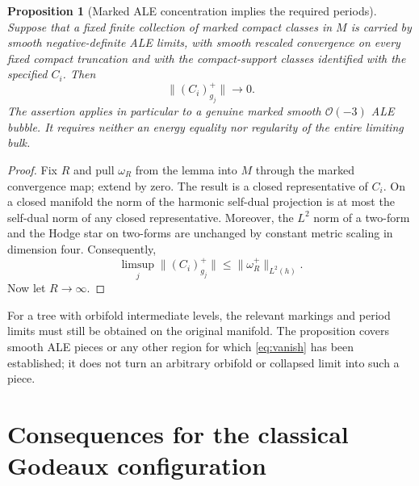 \documentclass[11pt,a4paper]{article}
\newtheorem{proposition}[theorem]{Proposition}
\theoremstyle{definition}
\theoremstyle{remark}
\begin{document}
\begin{proposition}[Marked ALE concentration implies the required periods]
Suppose that a fixed finite collection of marked compact classes in $M$
is carried by smooth negative-definite ALE limits, with smooth rescaled
convergence on every fixed compact truncation and with the compact-support
classes identified with the specified $C_i$. Then
\begin{equation}\label{eq:vanish}
 \|(C_i)^+_{g_j}\|\longrightarrow0.
\end{equation}
The assertion applies in particular to a genuine marked smooth
$\mathcal O(-3)$ ALE bubble. It requires neither an energy equality nor
regularity of the entire limiting bulk.
\end{proposition}
\begin{proof}
Fix $R$ and pull $\omega_R$ from the lemma into $M$ through the marked
convergence map; extend by zero. The result is a closed representative
of $C_i$. On a closed manifold the norm of the harmonic self-dual
projection is at most the self-dual norm of any closed representative.
Moreover, the $L^2$ norm of a two-form and the Hodge star on two-forms
are unchanged by constant metric scaling in dimension four. Consequently,
\[
 \limsup_j\|(C_i)^+_{g_j}\|\le\|\omega_R^+\|_{L^2(h)}.
\]
Now let $R\to\infty$.
\end{proof}

For a tree with orbifold intermediate levels, the relevant markings and
period limits must still be obtained on the original manifold. The
proposition covers smooth ALE pieces or any other region for which
\eqref{eq:vanish} has been established; it does not turn an arbitrary
orbifold or collapsed limit into such a piece.

\section{Consequences for the classical Godeaux configuration}
\end{document}
